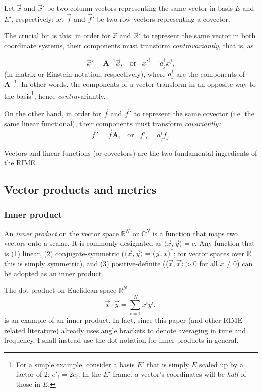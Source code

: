 \documentclass{aa}
\begin{document}
Let $\vec x$ and $\vec x'$ be two column vectors representing the same vector in basis $E$ and $E'$, respectively; let $\vec f$ and $\vec f'$ be two row vectors representing a covector.

The crucial bit is this: in order for $\vec x$ and $\vec x'$ to represent the same vector in both coordinate systems, their components must transform \emph{contravariantly}, that is, as

\[
  \vec x' = \mathbf{A}^{-1} \vec x,\;\;\;\mbox{or}\;\;\;x'^i = \tilde a^i_j x^j,
\]
(in matrix or Einstein notation, respectively), where $\tilde a^i_j$ are the components of $\mathbf{A}^{-1}.$ In other words, the components of a vector transform in an opposite way to the basis\footnote{For a simple example, consider a basis $E'$ that is simply $E$ scaled up by a factor of 2: $e'_i = 2e_i$. In the $E'$ frame, a vector's coordinates will be {\em half} of those in $E$.}, hence \emph{contra\/}variantly.

On the other hand, in order for $\vec f$ and $\vec f'$ to represent the same covector (i.e. the same linear functional), their components must transform \emph{covariantly:}
\[
  \vec f' = \vec f \mathbf{A},\;\;\;\mbox{or}\;\;\;f'_i = a^i_j f_j.
\]

Vectors and linear functions (or covectors) are the two fundamental ingredients of the RIME.

\subsection{Vector products and metrics}

\subsubsection{Inner product}
\label{sec:inner-prod}

\newcommand{\inprod}[2]{\langle #1,#2 \rangle}

An \emph{inner product} on the vector space $\mathbb{R}^N$ or $\mathbb{C}^N$ is a function that maps two vectors onto a scalar. It is commonly designated as $\inprod{\vec x}{\vec y}=c$. Any function that is (1) linear, (2) conjugate-symmetric ($\inprod{\vec x}{\vec y}=\inprod{\vec y}{\vec x}^*$; for vector spaces over $\mathbb{R}$ this is simply symmetric), and (3) positive-definite ($\inprod{\vec x}{\vec x}>0$ for all $x\ne0$) can be adopted as an inner product. 

The dot product on Euclidean space $\mathbb{R}^N$ \[ \vec x\cdot \vec y = \sum_{i=1}^{N}x^iy^i, \] is an example of an inner product. In fact, since this paper (and other RIME-related literature) already uses angle brackets to denote averaging in time and frequency, I shall instead use the dot notation for inner products in general.
\end{document}
